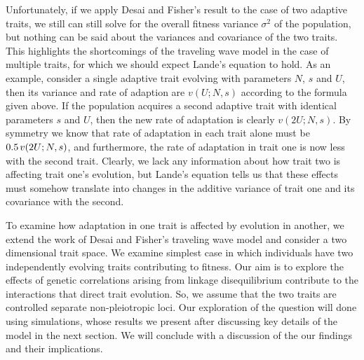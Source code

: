 \documentclass[9pt,twocolumn,twoside]{gsajnl}
\begin{document}
Unfortunately, if we apply Desai and Fisher's result to the case of two adaptive traits, we still can still solve for the overall fitness variance $\sigma^2$ of the population, but nothing can be said about the variances and covariance of the two traits. This highlights the shortcomings of the traveling wave model in the case of multiple traits, for which we should expect Lande's equation to hold. As an example, consider a single adaptive trait evolving with parameters $N$, $s$ and $U$, then its variance and rate of adaption are $v(U;N,s)$ according to the formula given above. If the population acquires a second adaptive trait with identical parameters $s$ and $U$, then the new rate of adaptation is clearly $v(2U;N,s)$. By symmetry we know that rate of adaptation in each trait alone must be $0.5 \hspace{.02 in} v(2U;N,s)$, and furthermore, the rate of adaptation in trait one is now less with the second trait. Clearly, we lack any information about how trait two is affecting trait one's evolution, but Lande's equation tells us that these effects must somehow translate into changes in the additive variance of trait one and its covariance with the second.\par
% 
% 
% 

To examine how adaptation in one trait is affected by evolution in another, we extend the work of Desai and Fisher's traveling wave model and consider a two dimensional trait space. We examine simplest case in which individuals have two independently evolving traits contributing to fitness. Our aim is to explore the effects of genetic correlations arising from linkage disequilibrium contribute to the interactions that direct trait evolution. So, we assume that the two traits are controlled separate non-pleiotropic loci. Our exploration of the question will done using simulations, whose results we present after discussing key details of the model in the next section. We will conclude with a discussion of the our findings and their implications.
% 
% 
\end{document}
